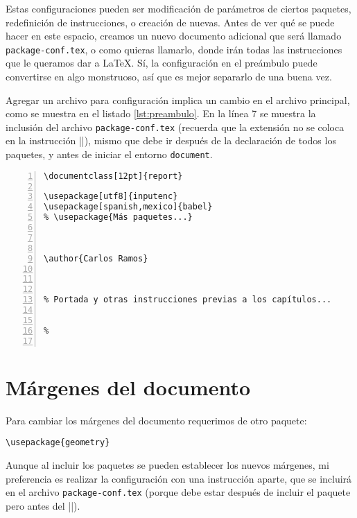 Estas configuraciones pueden ser modificación de parámetros de ciertos paquetes, redefinición de instrucciones, o creación de nuevas. Antes de ver qué se puede hacer en este espacio, creamos un nuevo documento adicional que será llamado \texttt{package-conf.tex}, o como quieras llamarlo, donde irán todas las instrucciones que le queramos dar a \LaTeX{}. Sí, la configuración en el preámbulo puede convertirse en algo monstruoso, así que es mejor separarlo de una buena vez.

Agregar un archivo para configuración implica un cambio en el archivo principal, como se muestra en el listado \ref{lst:preambulo}. En la línea 7 se muestra la inclusión del archivo \texttt{package-conf.tex} (recuerda que la extensión no se coloca en la instrucción ||), mismo que debe ir después de la declaración de todos los paquetes, y antes de iniciar el entorno \texttt{document}.

\begin{lstlisting}[style=latex,numbers=left,caption={Estructura de archivos para incluir configuración en el preámbulo.},label=lst:preambulo,
linebackgroundcolor={%
	\ifnum \value{lstnumber} =  7 \color{codigo_linea_resaltada}
	\else \color{codigo_fondo}
	\fi % Tantos \fi como líneas subrayadas.
}]
\documentclass[12pt]{report}

\usepackage[utf8]{inputenc}
\usepackage[spanish,mexico]{babel}
% \usepackage{Más paquetes...}



\author{Carlos Ramos}



% Portada y otras instrucciones previas a los capítulos...


% 


\end{lstlisting}



\section{Márgenes del documento}
\label{sec:margenes}



Para cambiar los márgenes del documento requerimos de otro paquete:

\begin{lstlisting}[style=latex]
\usepackage{geometry}
\end{lstlisting}

Aunque al incluir los paquetes se pueden establecer los nuevos márgenes, mi preferencia es realizar la configuración con una instrucción aparte, que se incluirá en el archivo \texttt{package-conf.tex} (porque debe estar después de incluir el paquete pero antes del ||).

